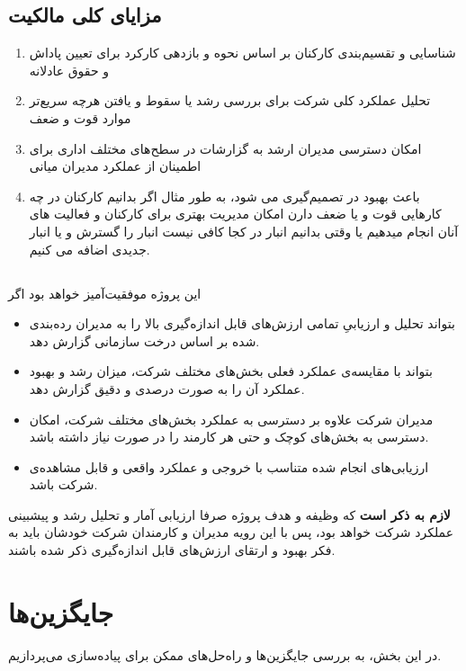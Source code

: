 \documentclass[12pt]{article}
\begin{document}
\subsection{مزایای کلی مالکیت }
\begin{enumerate}
    \item 
    شناسایی و تقسیم‌بندی کارکنان بر اساس نحوه و بازدهی کارکرد برای تعیین پاداش و حقوق عادلانه
    \item 
    تحلیل عملکرد کلی شرکت برای بررسی رشد یا سقوط و یافتن هرچه سریع‌تر موارد قوت و ضعف
    \item 
    امکان دسترسی مدیران ارشد به گزارشات در سطح‌های مختلف اداری برای اطمینان از عملکرد مدیران میانی 
    \item 
باعث بهبود در تصمیم‌گیری می شود، به طور مثال اگر بدانیم کارکنان در چه کارهایی قوت و یا ضعف دارن امکان مدیریت بهتری برای کارکنان و فعالیت های آنان انجام میدهیم یا وقتی بدانیم انبار در کجا کافی نیست انبار را گسترش و یا انبار جدیدی اضافه می کنیم.
\end{enumerate}
\subsection{}
این پروژه موفقیت‌آمیز خواهد بود اگر
\begin{itemize}
    \item 
    بتواند تحلیل و ارزیابیِ تمامی ارزش‌های قابل‌ اندازه‌گیری بالا را به مدیران رده‌بندی‌ شده بر اساس درخت سازمانی گزارش دهد.
    \item 
    بتواند با مقایسه‌ی عملکرد فعلی بخش‌های مختلف شرکت، میزان رشد و بهبود عملکرد آن را به صورت درصدی و دقیق گزارش دهد.
    \item
    مدیران شرکت علاوه‌ بر دسترسی به عملکرد بخش‌های مختلف شرکت، امکان دسترسی به بخش‌های کوچک و حتی هر کارمند را در صورت نیاز داشته باشد.

    \item 
    ارزیابی‌های انجام شده متناسب‌ با خروجی و عملکرد واقعی و قابل مشاهده‌ی شرکت باشد.
\end{itemize}

\textbf{لازم به ذکر است}
 که وظیفه و هدف پروژه صرفا ارزیابی آمار و تحلیل رشد و پیشبینی عملکرد شرکت خواهد بود، پس با این رویه مدیران و کارمندان شرکت خودشان باید به فکر بهبود و ارتقای ارزش‌های قابل اندازه‌گیری ذکر شده باشند.

\section{جایگزین‌ها}
در این بخش، به بررسی جایگزین‌ها و راه‌حل‌های ممکن برای پیاده‌سازی  می‌پردازیم.
\end{document}
